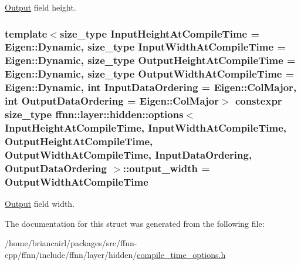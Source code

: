 \hyperlink{classffnn_1_1layer_1_1_output}{Output} field height. 

\hypertarget{structffnn_1_1layer_1_1hidden_1_1options_a1f31ac8402dd47157ea7dd8eba82c017}{
\subsubsection[{output\-\_\-width}]{\setlength{\rightskip}{0pt plus 5cm}template$<$size\-\_\-type Input\-Height\-At\-Compile\-Time = Eigen\-::\-Dynamic, size\-\_\-type Input\-Width\-At\-Compile\-Time = Eigen\-::\-Dynamic, size\-\_\-type Output\-Height\-At\-Compile\-Time = Eigen\-::\-Dynamic, size\-\_\-type Output\-Width\-At\-Compile\-Time = Eigen\-::\-Dynamic, int Input\-Data\-Ordering = Eigen\-::\-Col\-Major, int Output\-Data\-Ordering = Eigen\-::\-Col\-Major$>$ constexpr {\bf size\-\_\-type} {\bf ffnn\-::layer\-::hidden\-::options}$<$ Input\-Height\-At\-Compile\-Time, Input\-Width\-At\-Compile\-Time, Output\-Height\-At\-Compile\-Time, Output\-Width\-At\-Compile\-Time, Input\-Data\-Ordering, Output\-Data\-Ordering $>$\-::output\-\_\-width = Output\-Width\-At\-Compile\-Time\hspace{0.3cm}{\ttfamily [static]}}}\label{structffnn_1_1layer_1_1hidden_1_1options_a1f31ac8402dd47157ea7dd8eba82c017}


\hyperlink{classffnn_1_1layer_1_1_output}{Output} field width. 



The documentation for this struct was generated from the following file\-:\begin{DoxyCompactItemize}
\item 
/home/briancairl/packages/src/ffnn-\/cpp/ffnn/include/ffnn/layer/hidden/\hyperlink{hidden_2compile__time__options_8h}{compile\-\_\-time\-\_\-options.\-h}\end{DoxyCompactItemize}
